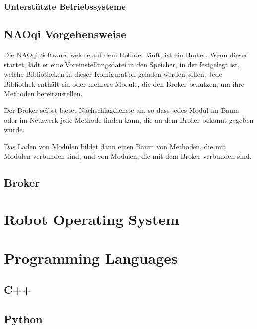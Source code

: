 \subsubsection{Unterstützte Betriebssysteme}
\label{subsubsec:UnterstützteBetriebssysteme}

\subsection{NAOqi Vorgehensweise}
\label{subsec:NAOqiVorgehensweise}
\par Die NAOqi Software, welche auf dem Roboter läuft, ist ein Broker. Wenn dieser startet, lädt er eine Voreinstellungsdatei in den Speicher, in der festgelegt ist, welche Bibliotheken in dieser Konfiguration geladen werden sollen. Jede Bibliothek enthält ein oder mehrere Module, die den Broker benutzen, um ihre Methoden bereitzustellen.
\par Der Broker selbst bietet Nachschlagdienste an, so dass jedes Modul im Baum oder im Netzwerk jede Methode finden kann, die an dem Broker bekannt gegeben wurde.
\par Das Laden von Modulen bildet dann einen Baum von Methoden, die mit Modulen verbunden sind, und von Modulen, die mit dem Broker verbunden sind.

\subsection{Broker}
\label{subsec:Broker}







\section{Robot Operating System}
\label{sec:ROS}

\section{Programming Languages}

\subsection{C++}
\label{subsec:Cpp}

\subsection{Python}
\label{subsec:Python}


